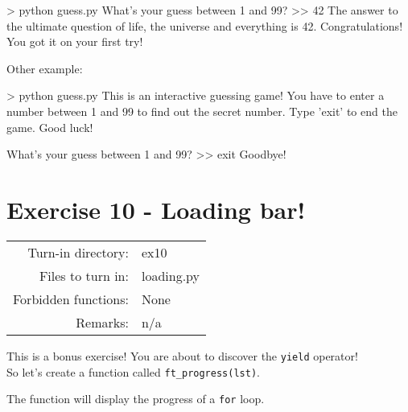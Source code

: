 \documentclass[]{article}
\newenvironment{Shaded}{\begin{snugshade}}{\end{snugshade}}
\newcommand{\BuiltInTok}[1]{\textcolor[rgb]{0.50,0.55,0.55}{#1}}
\newcommand{\ControlFlowTok}[1]{\textcolor[rgb]{0.99,0.74,0.29}{#1}}
\newcommand{\DecValTok}[1]{\textcolor[rgb]{0.96,0.45,0.00}{#1}}
\newcommand{\FloatTok}[1]{\textcolor[rgb]{0.96,0.45,0.00}{#1}}
\newcommand{\KeywordTok}[1]{\textcolor[rgb]{0.81,0.81,0.76}{#1}}
\newcommand{\NormalTok}[1]{\textcolor[rgb]{0.81,0.81,0.76}{#1}}
\newcommand{\OperatorTok}[1]{\textcolor[rgb]{0.81,0.81,0.76}{#1}}
\begin{document}
\begin{Shaded}
\begin{Highlighting}[]
\NormalTok{> python guess.py}
\NormalTok{What's your guess between 1 and 99?}
\NormalTok{>> 42}
\NormalTok{The answer to the ultimate question of life, the universe and everything is 42.}
\NormalTok{Congratulations! You got it on your first try!}
\end{Highlighting}
\end{Shaded}

Other example:

\begin{Shaded}
\begin{Highlighting}[]
\NormalTok{> python guess.py}
\NormalTok{This is an interactive guessing game!}
\NormalTok{You have to enter a number between 1 and 99 to find out the secret number.}
\NormalTok{Type 'exit' to end the game.}
\NormalTok{Good luck!}

\NormalTok{What's your guess between 1 and 99?}
\NormalTok{>> exit}
\NormalTok{Goodbye!}
\end{Highlighting}
\end{Shaded}

\clearpage

\hypertarget{exercise-10---loading-bar-1}{%
\section{Exercise 10 - Loading bar!}\label{exercise-10---loading-bar-1}}

\begin{longtable}[]{@{}rl@{}}
\toprule
\endhead
Turn-in directory: & ex10\tabularnewline
Files to turn in: & loading.py\tabularnewline
Forbidden functions: & None\tabularnewline
Remarks: & n/a\tabularnewline
\bottomrule
\end{longtable}

This is a bonus exercise! You are about to discover the \texttt{yield}
operator!\\
So let's create a function called \texttt{ft\_progress(lst)}.

The function will display the progress of a \texttt{for} loop.

\begin{Shaded}
\end{Shaded}
\end{document}
